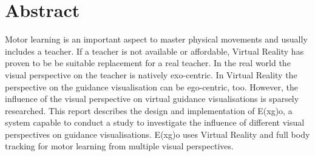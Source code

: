 \chapter*{Abstract}

Motor learning is an important aspect to master physical movements and usually includes a teacher. If a teacher is not available or affordable, Virtual Reality has proven to be be suitable replacement for a real teacher. In the real world the visual perspective on the teacher is natively exo-centric. In Virtual Reality the perspective on the guidance visualisation can be ego-centric, too. 
However, the influence of the visual perspective on virtual guidance visualisations is sparsely researched.
This report describes the design and implementation of E(x\textbar g)o, a system capable to conduct a study to investigate the influence of different visual perspectives on guidance visualisations. E(x\textbar g)o uses Virtual Reality and full body tracking for motor learning from multiple visual perspectives.

\thispagestyle{empty}